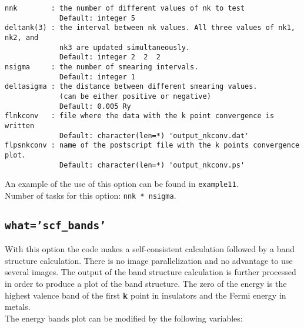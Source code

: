 \documentclass[12pt,a4paper]{article}
\begin{document}
\begin{verbatim}
nnk        : the number of different values of nk to test
             Default: integer 5
deltank(3) : the interval between nk values. All three values of nk1, nk2, and
             nk3 are updated simultaneously.
             Default: integer 2  2  2
nsigma     : the number of smearing intervals.
             Default: integer 1 
deltasigma : the distance between different smearing values.
             (can be either positive or negative)
             Default: 0.005 Ry
flnkconv   : file where the data with the k point convergence is written
             Default: character(len=*) 'output_nkconv.dat'
flpsnkconv : name of the postscript file with the k points convergence plot.
             Default: character(len=*) 'output_nkconv.ps'
\end{verbatim}
An example of the use of this option can be found in \texttt{example11}. \\
Number of tasks for this option: \texttt{nnk * nsigma}.

\subsection{\color{web-blue}\texttt{what='scf\_bands'}}
With this option the code makes a self-consistent calculation followed 
by a band structure calculation. There is no image parallelization and no
advantage to use several images. The output of the band structure 
calculation is further processed in order to produce a plot of the band 
structure.
The zero of the energy is the highest valence band 
of the first {\bf k} point in insulators and the Fermi energy in metals. \\
The energy bands plot can be modified by the following variables:
\end{document}
